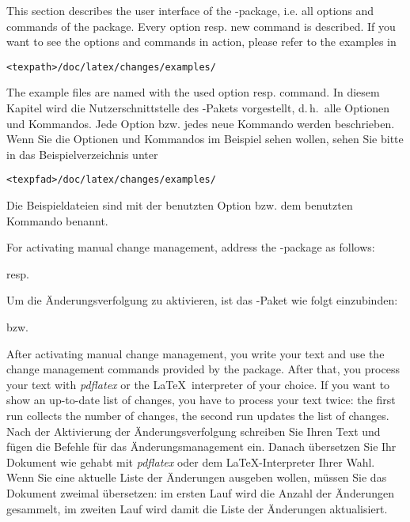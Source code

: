 \ifENGLISH
This section describes the user interface of the -package, i.e. all options and commands of the package.
Every option resp. new command is described.
If you want to see the options and commands in action, please refer to the examples in

\texttt{<texpath>/doc/latex/changes/examples/}

The example files are named with the used option resp. command.
\fi
\ifGERMAN
	In diesem Kapitel wird die Nutzerschnittstelle des -Pakets vorgestellt, d.\,h.\ alle Optionen und Kommandos.
	Jede Option bzw. jedes neue Kommando werden beschrieben.
	Wenn Sie die Optionen und Kommandos im Beispiel sehen wollen, sehen Sie bitte in das Beispielverzeichnis unter

	\texttt{<texpfad>/doc/latex/changes/examples/}

	Die Beispieldateien sind mit der benutzten Option bzw. dem benutzten Kommando benannt.
\fi

\ifENGLISH
For activating manual change management, address the -package as follows:


resp.

\fi
\ifGERMAN
	Um die Änderungsverfolgung zu aktivieren, ist das -Paket wie folgt einzubinden:


	bzw.

\fi

\ifENGLISH
After activating manual change management, you write your text and use the change management commands provided by the package.
After that, you process your text with \emph{pdflatex} or the \LaTeX\ interpreter of your choice.
If you want to show an up-to-date list of changes, you have to process your text twice: the first run collects the number of changes, the second run updates the list of changes.
\fi
\ifGERMAN
	Nach der Aktivierung der Änderungsverfolgung schreiben Sie Ihren Text und fügen die Befehle für das Änderungsmanagement ein.
	Danach übersetzen Sie Ihr Dokument wie gehabt mit \emph{pdflatex} oder dem \LaTeX-Interpreter Ihrer Wahl.
	Wenn Sie eine aktuelle Liste der Änderungen ausgeben wollen, müssen Sie das Dokument zweimal übersetzen: im ersten Lauf wird die Anzahl der Änderungen gesammelt, im zweiten Lauf wird damit die Liste der Änderungen aktualisiert.
\fi

